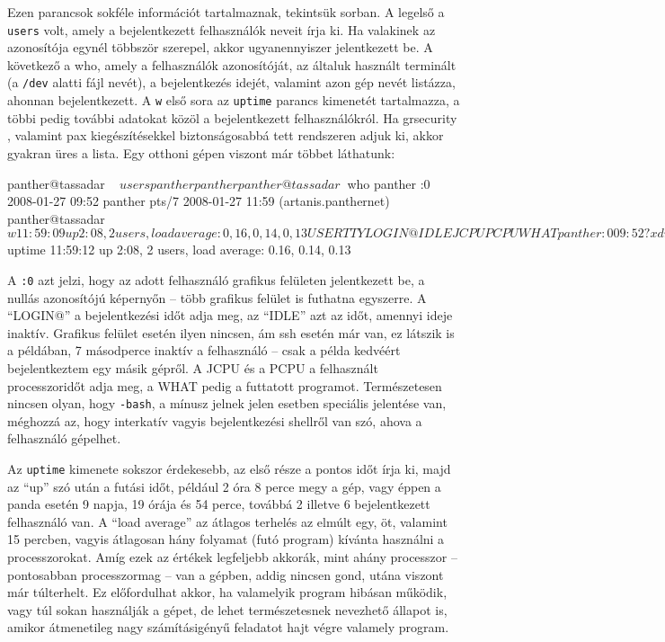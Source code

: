 Ezen parancsok sokféle információt tartalmaznak, tekintsük sorban. A legelső a
\texttt{users} volt, amely a bejelentkezett felhasználók neveit írja ki. Ha
valakinek az azonosítója egynél többször szerepel, akkor ugyanennyiszer
jelentkezett be. A következő a who, amely a felhasználók azonosítóját, az
általuk használt terminált (a \texttt{/dev} alatti fájl nevét), a bejelentkezés
idejét, valamint azon gép nevét listázza, ahonnan bejelentkezett. A \texttt{w}
első sora az \texttt{uptime} parancs kimenetét tartalmazza, a többi pedig
további adatokat közöl a bejelentkezett felhasználókról. Ha grsecurity
\cite{grsecurity}, valamint pax \cite{pax} kiegészítésekkel biztonságosabbá tett
rendszeren adjuk ki, akkor gyakran üres a lista. Egy otthoni gépen viszont már
többet láthatunk:

\begin{VerbExample}
panther@tassadar ~ $ users
panther panther
panther@tassadar ~ $ who
panther  :0           2008-01-27 09:52
panther  pts/7        2008-01-27 11:59 (artanis.panthernet)
panther@tassadar ~ $ w
 11:59:09 up  2:08,  2 users,  load average: 0,16, 0,14, 0,13
USER     TTY        LOGIN@   IDLE   JCPU   PCPU WHAT
panther  :0        09:52   ?xdm?   5:43   0.00s /bin/sh /usr/kde/3.5/bin/startkde
panther  pts/7     11:59    7.00s  0.16s  0.16s -bash
panther@tassadar ~ $ uptime
 11:59:12 up  2:08,  2 users,  load average: 0.16, 0.14, 0.13
\end{VerbExample}

A \texttt{:0} azt jelzi, hogy az adott felhasználó grafikus felületen
jelentkezett be, a nullás azonosítójú képernyőn -- több grafikus felület is
futhatna egyszerre. A ``LOGIN@'' a bejelentkezési időt adja meg, az ``IDLE'' azt
az időt, amennyi ideje inaktív. Grafikus felület esetén ilyen nincsen, ám ssh
esetén már van, ez látszik is a példában, 7 másodperce inaktív a felhasználó --
csak a példa kedvéért bejelentkeztem egy másik gépről. A JCPU és a PCPU a
felhasznált processzoridőt adja meg, a WHAT pedig a futtatott
programot. Természetesen nincsen olyan, hogy \texttt{-bash}, a mínusz jelnek
jelen esetben speciális jelentése van, méghozzá az, hogy interkatív vagyis
bejelentkezési shellről van szó, ahova a felhasználó gépelhet.

Az \texttt{uptime} kimenete sokszor érdekesebb, az első része a pontos időt írja
ki, majd az ``up'' szó után a futási időt, például 2 óra 8 perce megy a gép,
vagy éppen a panda esetén 9 napja, 19 órája és 54 perce, továbbá 2 illetve 6
bejelentkezett felhasználó van. A ``load average'' az átlagos terhelés az elmúlt
egy, öt, valamint 15 percben, vagyis átlagosan hány folyamat (futó program)
kívánta használni a processzorokat. Amíg ezek az értékek legfeljebb akkorák,
mint ahány processzor -- pontosabban processzormag -- van a gépben, addig
nincsen gond, utána viszont már túlterhelt. Ez előfordulhat akkor, ha valamelyik
program hibásan működik, vagy túl sokan használják a gépet, de lehet
természetesnek nevezhető állapot is, amikor átmenetileg nagy számításigényű
feladatot hajt végre valamely program.

